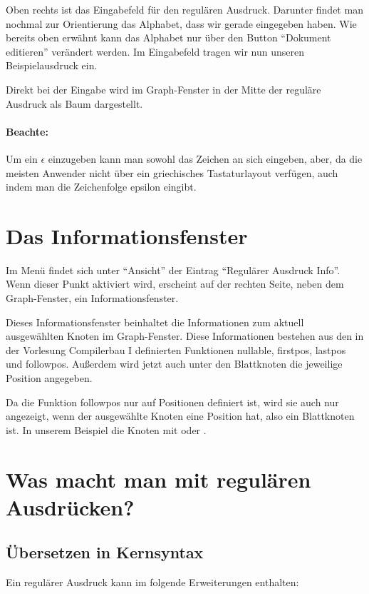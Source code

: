 Oben rechts ist das Eingabefeld für den regulären Ausdruck. Darunter findet man nochmal zur Orientierung das Alphabet, dass wir gerade eingegeben haben. Wie bereits oben erwähnt kann das Alphabet nur über den Button "`Dokument editieren"' verändert werden. Im Eingabefeld tragen wir nun unseren Beispielausdruck  ein.

Direkt bei der Eingabe wird im Graph-Fenster in der Mitte der reguläre Ausdruck als Baum dargestellt.

\paragraph*{Beachte:} Um ein $\epsilon$ einzugeben kann man sowohl das Zeichen an sich eingeben, aber, da die meisten Anwender nicht über ein griechisches Tastaturlayout verfügen, auch indem man die Zeichenfolge epsilon eingibt.

\section{Das Informationsfenster}

Im Menü findet sich unter "`Ansicht"' der Eintrag "`Regulärer Ausdruck Info"'. Wenn dieser Punkt aktiviert wird, erscheint auf der rechten Seite, neben dem Graph-Fenster, ein Informationsfenster.

Dieses Informationsfenster beinhaltet die Informationen zum aktuell ausgewählten Knoten im Graph-Fenster. Diese Informationen bestehen aus den in der Vorlesung Compilerbau I definierten Funktionen nullable, firstpos, lastpos und followpos. Außerdem wird jetzt auch unter den Blattknoten die jeweilige Position angegeben.

Da die Funktion followpos nur auf Positionen definiert ist, wird sie auch nur angezeigt, wenn der ausgewählte Knoten eine Position hat, also ein Blattknoten ist. In unserem Beispiel die Knoten mit  oder .

\section{Was macht man mit regulären Ausdrücken?}

\subsection{Übersetzen in Kernsyntax}

Ein regulärer Ausdruck kann im \gtitool folgende Erweiterungen enthalten:

